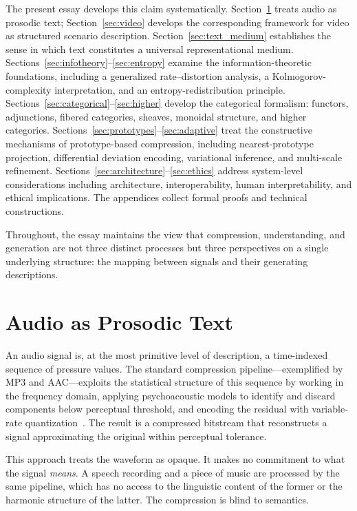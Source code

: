 \documentclass[12pt,a4paper]{article}
\theoremstyle{definition}
\theoremstyle{remark}
\begin{document}
The present essay develops this claim systematically. Section~\ref{sec:audio} treats audio as prosodic text; Section~\ref{sec:video} develops the corresponding framework for video as structured scenario description. Section~\ref{sec:text_medium} establishes the sense in which text constitutes a universal representational medium. Sections~\ref{sec:infotheory}--\ref{sec:entropy} examine the information-theoretic foundations, including a generalized rate--distortion analysis, a Kolmogorov-complexity interpretation, and an entropy-redistribution principle. Sections~\ref{sec:categorical}--\ref{sec:higher} develop the categorical formalism: functors, adjunctions, fibered categories, sheaves, monoidal structure, and higher categories. Sections~\ref{sec:prototypes}--\ref{sec:adaptive} treat the constructive mechanisms of prototype-based compression, including nearest-prototype projection, differential deviation encoding, variational inference, and multi-scale refinement. Sections~\ref{sec:architecture}--\ref{sec:ethics} address system-level considerations including architecture, interoperability, human interpretability, and ethical implications. The appendices collect formal proofs and technical constructions.

Throughout, the essay maintains the view that compression, understanding, and generation are not three distinct processes but three perspectives on a single underlying structure: the mapping between signals and their generating descriptions.

\section{Audio as Prosodic Text}
\label{sec:audio}

An audio signal is, at the most primitive level of description, a time-indexed sequence of pressure values. The standard compression pipeline---exemplified by MP3 and AAC---exploits the statistical structure of this sequence by working in the frequency domain, applying psychoacoustic models to identify and discard components below perceptual threshold, and encoding the residual with variable-rate quantization~\cite{coverthomas}. The result is a compressed bitstream that reconstructs a signal approximating the original within perceptual tolerance.

This approach treats the waveform as opaque. It makes no commitment to what the signal \emph{means}. A speech recording and a piece of music are processed by the same pipeline, which has no access to the linguistic content of the former or the harmonic structure of the latter. The compression is blind to semantics.
\end{document}
